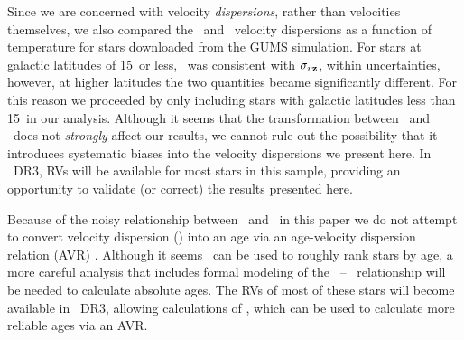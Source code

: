 Since we are concerned with velocity {\it dispersions}, rather than velocities
themselves, we also compared the \vb\ and \vz\ velocity dispersions as a
function of temperature for
stars downloaded from the GUMS simulation.
For stars at galactic latitudes of 15\degrees\ or less, \sigmavb\ was
consistent with $\sigma_{v{\bf z}}$, within uncertainties, however, at higher
latitudes the two quantities became significantly different.
For this reason we proceeded by only including stars with galactic latitudes
less than 15\degrees\ in our analysis.
Although it seems that the transformation between \vz\ and \vb\ does not {\it
strongly} affect our results, we cannot rule out the possibility that it
introduces systematic biases into the velocity dispersions we present here.
In \gaia\ DR3, RVs will be available for most stars in this sample, providing
an opportunity to validate (or correct) the results presented here.



Because of the noisy relationship between \vb\ and \vz\, in this paper we do
not attempt to convert velocity dispersion (\sigmavb) into an age via an
age-velocity dispersion relation (AVR) \citep[\eg][]{holmberg2009}.
Although it seems \sigmavb\ can be used to roughly rank stars by age, a more
careful analysis that includes formal modeling of the \vb\ -- \vz\
relationship will be needed to calculate absolute ages.
The RVs of most of these stars will become available in \Gaia\ DR3, allowing
calculations of \vz, which can be used to calculate more reliable ages via an
AVR.

